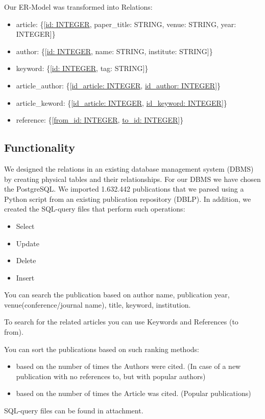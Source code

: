 \documentclass{article}
\begin{document}
\newpage
Our ER-Model was transformed into Relations:
\begin{itemize} 
	\item article: \{[\underline{id: INTEGER}, paper\_title: STRING, venue: STRING, year: INTEGER]\}
	\item author: \{[\underline{id: INTEGER}, name: STRING, institute: STRING]\}
	\item keyword: \{[\underline{id: INTEGER}, tag: STRING]\}
	\item article\_author: \{[\underline{id\_article: INTEGER}, \underline{id\_author: INTEGER}]\}
	\item article\_keword: \{[\underline{id\_article: INTEGER}, \underline{id\_keyword: INTEGER}]\}
	\item reference: \{[\underline{from\_id: INTEGER}, \underline{to\_id: INTEGER}]\}
\end{itemize} 

\subsection{Functionality}
We designed the relations in an existing database management system (DBMS) by creating physical tables and their relationships. For our DBMS we have chosen the PostgreSQL. We imported 1.632.442 publications that we parsed using a Python script from an existing publication repository (DBLP).
In addition, we created the SQL-query files that perform such operations:
\begin{itemize} 
	\item Select
	\item Update
	\item Delete
	\item Insert
\end{itemize}
You can search the publication based on author name, publication year, venue(conference/journal name), title, keyword, institution. 

To search for the related articles you can use Keywords and References (to\\from).

You can sort the publications based on such ranking methods:
\begin{itemize} 
	\item based on the number of times the Authors were cited. (In case of a new publication with no references to, but with popular authors)
	\item based on the number of times the Article was cited. (Popular publications)
\end{itemize}
SQL-query files can be found in attachment.
\\
\end{document}
